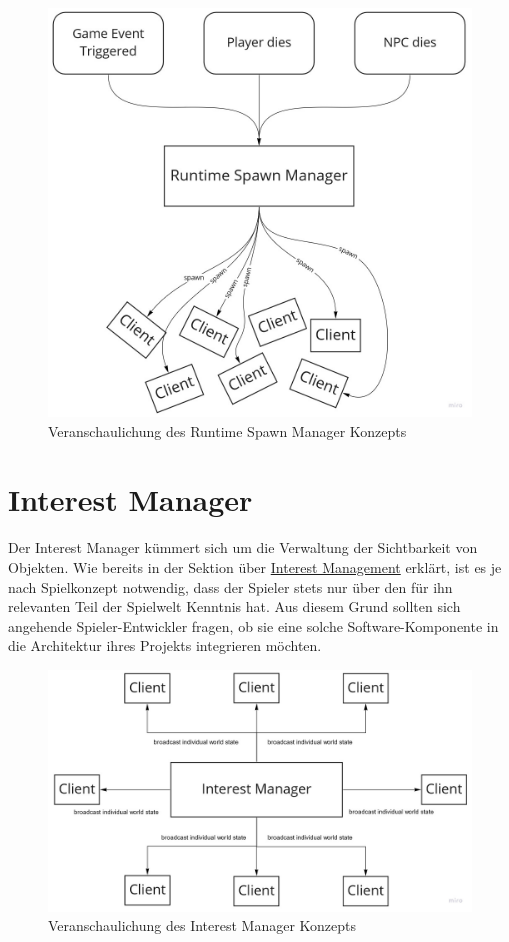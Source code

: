 \begin{figure}
	\centering
	\includegraphics[width=150mm]{images/Runtime_Spawn_Manager.jpg}
	\caption[Runtime Spawn Manager]{Veranschaulichung des Runtime Spawn Manager Konzepts}
	\label{pic:Runtime_Spawn_Manager}
\end{figure}

\section{Interest Manager}

Der Interest Manager kümmert sich um die Verwaltung der Sichtbarkeit von Objekten. Wie bereits in der Sektion über \hyperref[interest_management]{Interest Management} erklärt, ist es je nach Spielkonzept notwendig, dass der Spieler stets nur über den für ihn relevanten Teil der Spielwelt Kenntnis hat. Aus diesem Grund sollten sich angehende Spieler-Entwickler fragen, ob sie eine solche Software-Komponente in die Architektur ihres Projekts integrieren möchten.

\begin{figure}
	\centering
	\includegraphics[width=150mm]{images/Interest_Manager.jpg}
	\caption[Interest Manager]{Veranschaulichung des Interest Manager Konzepts}
	\label{pic:Interest_Manager}
\end{figure}


